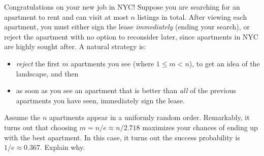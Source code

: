 \begin{question}
	Congratulations on your new job in NYC! Suppose you are searching for an apartment to rent and can visit at most $n$ listings in total. After viewing each apartment, you must either sign the lease \emph{immediately} (ending your search), or reject the apartment with no option to reconsider later, since apartments in NYC are highly sought after.
	A natural strategy is:
	\begin{itemize}
		\item[(i)] \emph{reject} the first $m$ apartments you see  (where $1\leq m < n$), to get an idea of the landscape, and then
		\item[(ii)] as soon as you see an apartment that is better than \emph{all} of the previous apartments you have seen, immediately sign the lease.
	\end{itemize}
	Assume the $n$ apartments appear in a uniformly random order. Remarkably, it turns out that choosing $m = n/e \approx n/2.718$ maximizes your chances of ending up with the best apartment. In this case, it turns out the success probability is $1/e \approx 0.367$. Explain why.

\end{question}
